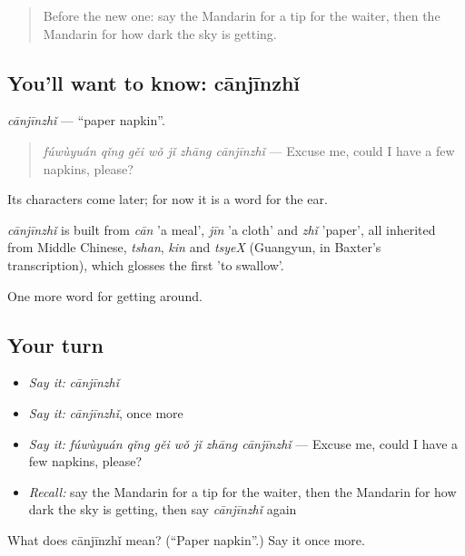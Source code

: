 \label{lesson:ZH-C452-canjinzhi}



\begin{quote}
Before the new one: say the Mandarin for a tip for the waiter, then the Mandarin for how dark the sky is getting.
\end{quote}

\subsection*{You'll want to know: cānjīnzhǐ}
\emph{cānjīnzhǐ} — \textquotedblleft{}paper napkin\textquotedblright{}.

\begin{quote}
\emph{fúwùyuán qǐng gěi wǒ jǐ zhāng cānjīnzhǐ} — Excuse me, could I have a few napkins, please?
\end{quote}

Its characters come later; for now it is a word for the ear.

\begin{cousinweb}
\emph{cānjīnzhǐ} is built from \emph{cān} 'a meal', \emph{jīn} 'a cloth' and \emph{zhǐ} 'paper', all inherited from Middle Chinese, \emph{tshan}, \emph{kin} and \emph{tsyeX} (Guangyun, in Baxter's transcription), which glosses the first 'to swallow'.
\end{cousinweb}

\begin{grammarlens}[title={What you've built}]
One more word for getting around.
\end{grammarlens}

\subsection*{Your turn}
\begin{itemize}
\raggedright
  \item \emph{Say it:} \emph{cānjīnzhǐ}
  \item \emph{Say it:} \emph{cānjīnzhǐ}, once more
  \item \emph{Say it:} \emph{fúwùyuán qǐng gěi wǒ jǐ zhāng cānjīnzhǐ} — Excuse me, could I have a few napkins, please?
  \item \emph{Recall:} say the Mandarin for a tip for the waiter, then the Mandarin for how dark the sky is getting, then say \emph{cānjīnzhǐ} again
\end{itemize}

\begin{tcolorbox}[breakable,colback=teal!4,colframe=teal!35!black,title={Before you move on}]
What does cānjīnzhǐ mean? (\textquotedblleft{}Paper napkin\textquotedblright{}.) Say it once more.
\end{tcolorbox}
